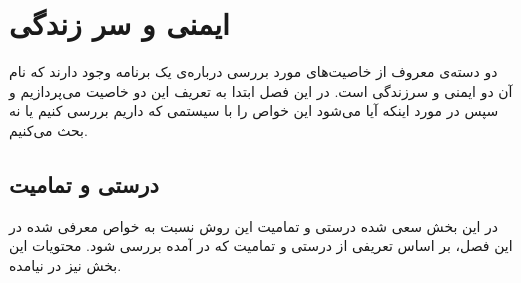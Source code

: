 
\chapter{ایمنی و سر زندگی}

دو دسته‌ی معروف از خاصیت‌های مورد بررسی درباره‌ی یک برنامه وجود دارند که نام آن دو ایمنی و سرزندگی است. در این فصل ابتدا به تعریف این دو خاصیت می‌پردازیم و سپس در مورد اینکه آیا می‌شود این خواص را با سیستمی که داریم بررسی کنیم یا نه بحث می‌کنیم.





\section{درستی و تمامیت}
در این بخش سعی شده درستی و تمامیت این روش نسبت به خواص معرفی شده در این فصل، بر اساس تعریفی از درستی و تمامیت که در \cite{statica} آمده بررسی شود. محتویات این بخش نیز در \cite{calcul} نیامده.

